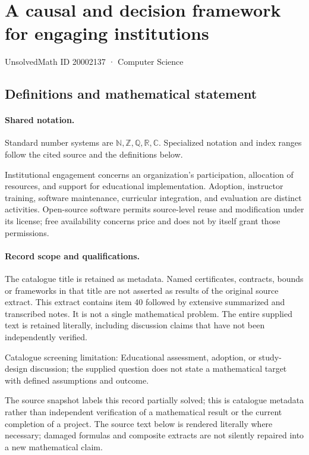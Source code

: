 \documentclass[11pt]{article}
\begin{document}
\setcounter{section}{20002136}
\section{A causal and decision framework for engaging institutions}\label{20002137}
{\small\sffamily UnsolvedMath ID 20002137 · Computer Science}
\subsection{Definitions and mathematical statement}

\paragraph{Shared notation.}Standard number systems are $\mathbb N,\mathbb Z,\mathbb Q,\mathbb R,\mathbb C$. Specialized notation and index ranges follow the cited source and the definitions below.


Institutional engagement concerns an organization's participation, allocation of resources, and support for educational implementation. Adoption, instructor training, software maintenance, curricular integration, and evaluation are distinct activities. Open-source software permits source-level reuse and modification under its license; free availability concerns price and does not by itself grant those permissions.
\paragraph{Record scope and qualifications.}
The catalogue title is retained as metadata. Named certificates, contracts, bounds or frameworks in that title are not asserted as results of the original source extract.
This extract contains item 40 followed by extensive summarized and transcribed notes. It is not a single mathematical problem. The entire supplied text is retained literally, including discussion claims that have not been independently verified.

Catalogue screening limitation: Educational assessment, adoption, or study-design discussion; the supplied question does not state a mathematical target with defined assumptions and outcome.

The source snapshot labels this record partially solved; this is catalogue metadata rather than independent verification of a mathematical result or the current completion of a project.
The source text below is rendered literally where necessary; damaged formulas and composite extracts are not silently repaired into a new mathematical claim.
\end{document}
